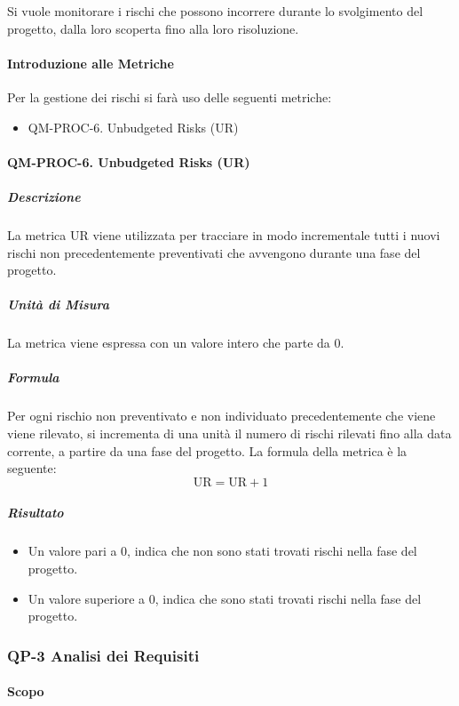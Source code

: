 		Si vuole monitorare i rischi che possono incorrere durante lo svolgimento del progetto, dalla loro scoperta fino alla loro risoluzione.

		\paragraph{Introduzione alle Metriche}

		Per la gestione dei rischi si farà uso delle seguenti metriche:

		\begin{itemize}
			\item QM-PROC-6. Unbudgeted Risks (UR)
		\end{itemize}

		\paragraph{QM-PROC-6. Unbudgeted Risks (UR)}

			\subparagraph{Descrizione}
			La metrica UR viene utilizzata per tracciare in modo incrementale tutti i nuovi rischi non precedentemente preventivati che avvengono durante una fase del progetto.

			\subparagraph{Unità di Misura}
			La metrica viene espressa con un valore intero che parte da 0.

			\subparagraph{Formula}
			Per ogni rischio non preventivato e non individuato precedentemente che viene viene rilevato, si incrementa di una unità il numero di rischi rilevati fino alla data corrente, a partire da una fase del progetto.
			La formula della metrica è la seguente:
			\[
				\text{UR} = \text{UR} + 1
			\]

			\subparagraph{Risultato}
			\begin{itemize}
				\item Un valore pari a 0, indica che non sono stati trovati rischi nella fase del progetto.
				\item Un valore superiore a 0, indica che sono stati trovati rischi nella fase del progetto.
			\end{itemize}

	\subsubsection{QP-3 Analisi dei Requisiti}

		\paragraph{Scopo}

